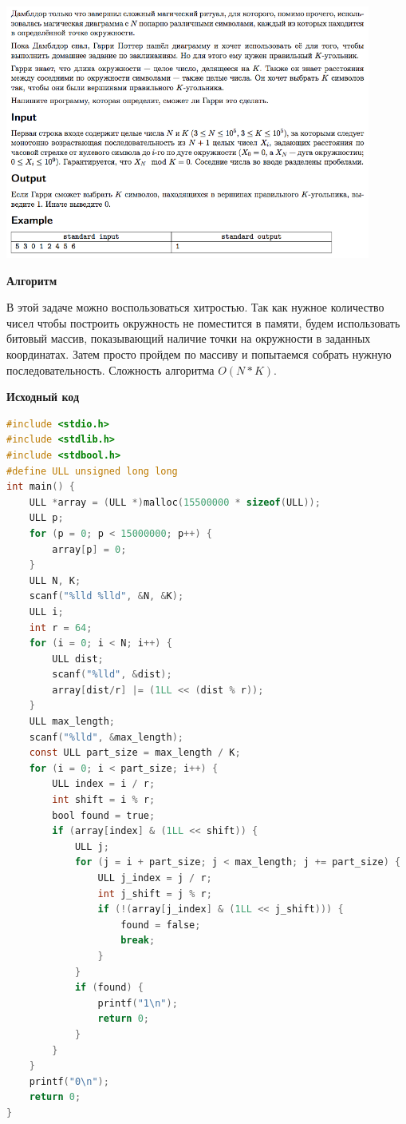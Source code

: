\documentclass[a4paper,12pt]{article}
\begin{document}
\begin{center}
\includegraphics[width=0.9\textwidth]{OC_Ukraine/D.png}\\ [1cm]
\end{center}

\textbf{{\large Алгоритм}}

В этой задаче можно воспользоваться хитростью. Так как нужное количество чисел чтобы построить окружность не поместится в памяти, будем использовать битовый массив, показывающий наличие точки на окружности в заданных координатах. Затем просто пройдем по массиву и попытаемся собрать нужную последовательность. Сложность алгоритма $O(N * K)$.

\newpage
\textbf{{\large Исходный код}} \\
\begin{lstlisting}[language=C]
#include <stdio.h>
#include <stdlib.h>
#include <stdbool.h>
#define ULL unsigned long long
int main() {
    ULL *array = (ULL *)malloc(15500000 * sizeof(ULL));
    ULL p;
    for (p = 0; p < 15000000; p++) {
        array[p] = 0;
    }
    ULL N, K;
    scanf("%lld %lld", &N, &K);
    ULL i;
    int r = 64;
    for (i = 0; i < N; i++) {
        ULL dist;
        scanf("%lld", &dist);
        array[dist/r] |= (1LL << (dist % r));
    }
    ULL max_length;
    scanf("%lld", &max_length);
    const ULL part_size = max_length / K;
    for (i = 0; i < part_size; i++) {
        ULL index = i / r;
        int shift = i % r;
        bool found = true;
        if (array[index] & (1LL << shift)) {
            ULL j;
            for (j = i + part_size; j < max_length; j += part_size) {
                ULL j_index = j / r;
                int j_shift = j % r;
                if (!(array[j_index] & (1LL << j_shift))) {
                    found = false;
                    break;
                }
            }
            if (found) {
                printf("1\n");
                return 0;
            }
        }
    }
    printf("0\n");
    return 0;
}
\end{lstlisting}
\end{document}
